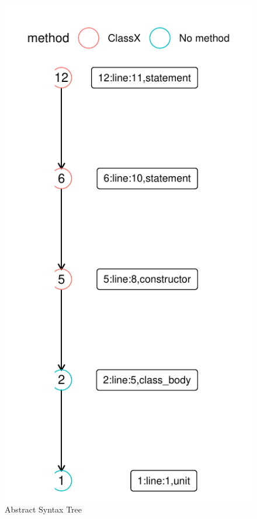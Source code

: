 \documentclass[
]{article}
\begin{document}
\begin{figure}[H]
\includegraphics[width=1\linewidth]{report_files/figure-latex/unnamed-chunk-10-1} \caption{Abstract Syntax Tree \label{AST_alert_1}}\label{fig:unnamed-chunk-10}
\end{figure}
\end{document}
